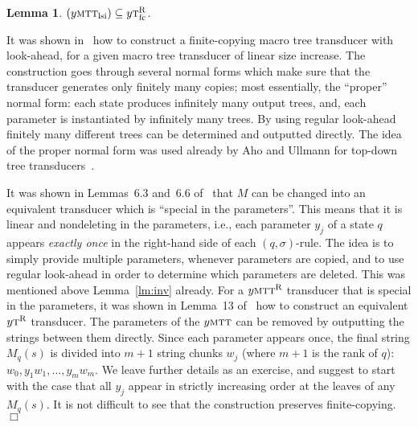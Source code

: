 \documentclass[copyright,creativecommons]{eptcs}
\newtheorem{lemma}{Lemma}
\newcommand{\eop}{\hspace*{\fill}$\Box$}
\newenvironment{proof}{{\it Proof.}\quad}{\eop\vspace*{4mm}}
\newcommand{\trfc}{\textsc{t}^{\text{R}}_{\text{fc}}}
\newcommand{\tr}{\textsc{t}^{\text{R}}}
\newcommand{\mtt}{\textsc{mtt}}
\newcommand{\mttlsi}{\textsc{mtt}_{\text{lsi}}}
\newcommand{\mttr}{\textsc{mtt}^{\text{R}}}
\begin{document}
\begin{lemma}\rm\label{lm:ymtt}
$(y\mttlsi)\subseteq y\trfc$.
\end{lemma}
\begin{proof}
It was shown in~\cite{DBLP:journals/siamcomp/EngelfrietM03} 
how to construct a finite-copying macro tree transducer
with look-ahead, for a given macro tree transducer of linear size increase.
The construction goes through several normal forms which make sure that
the transducer generates only finitely many copies; most essentially, the ``proper''
normal form: each state produces infinitely many output trees, and, each parameter
is instantiated by infinitely many trees. By using regular look-ahead finitely
many different trees can be determined and outputted directly.
The idea of the proper normal form was used already by 
Aho and Ullmann for top-down tree transducers~\cite{DBLP:journals/iandc/AhoU71}.

It was shown in Lemmas~6.3 and~6.6 of~\cite{DBLP:journals/iandc/EngelfrietM99}
that $M$ can be changed into an equivalent transducer which is
``special in the parameters''. This means that it is linear and nondeleting in
the parameters, i.e., each parameter $y_j$ of a state $q$ appears \emph{exactly once} 
in the right-hand side of each $(q,\sigma)$-rule.
The idea is to simply provide multiple parameters, whenever parameters are copied,
and to use regular look-ahead in order to determine which parameters are deleted. 
This was mentioned above Lemma~\ref{lm:inv} already. 
For a $y\mttr$ transducer that is special in the parameters, it was shown in
Lemma~13 of~\cite{DBLP:journals/jcss/EngelfrietM02} how to construct an equivalent
$y\tr$ transducer. The parameters of the $y\mtt$ can be removed by outputting the
strings between them directly.  Since each parameter appears once, the final string 
$M_q(s)$ is divided into $m+1$ string chunks $w_j$ (where $m+1$ is the rank of $q$):
$w_0,y_1w_1,\dots,y_mw_m$. We leave further details as an exercise,
and suggest to start with the case that all $y_j$ appear in strictly increasing
order at the leaves of any $M_q(s)$.
It is not difficult to see that the construction preserves 
finite-copying.
\end{proof}
\end{document}

